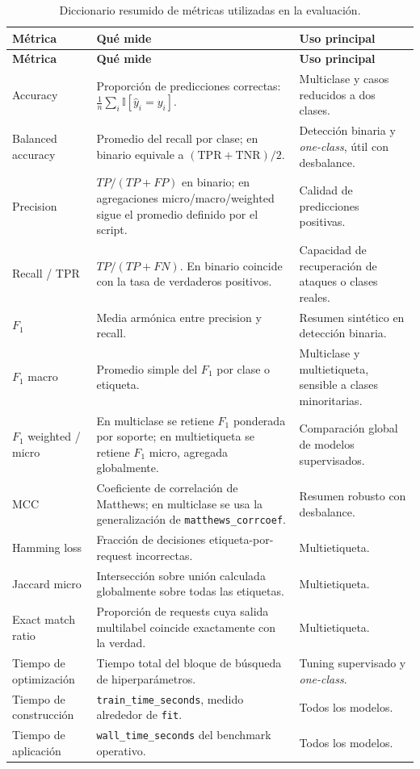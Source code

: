 \documentclass[12pt,oneside]{report}
\newcommand{\ind}{\mathbb{I}} %
\begin{document}
\begin{longtable}{@{}L{0.24\textwidth}L{0.43\textwidth}L{0.25\textwidth}@{}}
\caption{Diccionario resumido de métricas utilizadas en la evaluación.}\label{tab:diccionario-metricas}\\
\toprule
\textbf{Métrica} & \textbf{Qué mide} & \textbf{Uso principal} \\
\midrule
\endfirsthead
\toprule
\textbf{Métrica} & \textbf{Qué mide} & \textbf{Uso principal} \\
\midrule
\endhead
Accuracy & Proporción de predicciones correctas: $\frac{1}{n}\sum_i \ind[\hat y_i=y_i]$. & Multiclase y casos reducidos a dos clases. \\
Balanced accuracy & Promedio del recall por clase; en binario equivale a $(\mathrm{TPR}+\mathrm{TNR})/2$. & Detección binaria y \textit{one-class}, útil con desbalance. \\
Precision & $TP/(TP+FP)$ en binario; en agregaciones micro/macro/weighted sigue el promedio definido por el script. & Calidad de predicciones positivas. \\
Recall / TPR & $TP/(TP+FN)$. En binario coincide con la tasa de verdaderos positivos. & Capacidad de recuperación de ataques o clases reales. \\
$F_1$ & Media armónica entre precision y recall. & Resumen sintético en detección binaria. \\
$F_1$ macro & Promedio simple del $F_1$ por clase o etiqueta. & Multiclase y multietiqueta, sensible a clases minoritarias. \\
$F_1$ weighted / micro & En multiclase se retiene $F_1$ ponderada por soporte; en multietiqueta se retiene $F_1$ micro, agregada globalmente. & Comparación global de modelos supervisados. \\
MCC & Coeficiente de correlación de Matthews; en multiclase se usa la generalización de \texttt{matthews\_corrcoef}. & Resumen robusto con desbalance. \\
Hamming loss & Fracción de decisiones etiqueta-por-request incorrectas. & Multietiqueta. \\
Jaccard micro & Intersección sobre unión calculada globalmente sobre todas las etiquetas. & Multietiqueta. \\
Exact match ratio & Proporción de requests cuya salida multilabel coincide exactamente con la verdad. & Multietiqueta. \\
Tiempo de optimización & Tiempo total del bloque de búsqueda de hiperparámetros. & Tuning supervisado y \textit{one-class}. \\
Tiempo de construcción & \texttt{train\_time\_seconds}, medido alrededor de \texttt{fit}. & Todos los modelos. \\
Tiempo de aplicación & \texttt{wall\_time\_seconds} del benchmark operativo. & Todos los modelos. \\
\bottomrule
\end{longtable}
\end{document}
